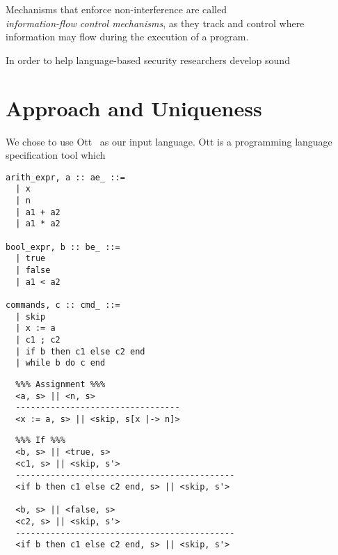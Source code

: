 \documentclass[sigplan,10pt]{acmart}\settopmatter{printfolios=true,printccs=false,printacmref=false}
\begin{document}
Mechanisms that enforce non-interference are called \\\emph{information-flow control mechanisms}, as they track and control where information may flow during the execution of a program.



In order to help language-based security researchers develop sound




\section{Approach and Uniqueness}
We chose to use Ott~\cite{DBLP:journals/jfp/SewellNOPRSS10} as our input language. Ott is a programming language specification tool which 



\begin{lstlisting}[captionpos=b,caption=Syntax of a simple imperative language]
arith_expr, a :: ae_ ::=
  | x         
  | n                        
  | a1 + a2                  
  | a1 * a2                       

bool_expr, b :: be_ ::=
  | true                        
  | false   
  | a1 < a2          

commands, c :: cmd_ ::=
  | skip    
  | x := a 
  | c1 ; c2           
  | if b then c1 else c2 end
  | while b do c end   
\end{lstlisting}

\begin{lstlisting}
  %%% Assignment %%%
  <a, s> || <n, s>
  ---------------------------------
  <x := a, s> || <skip, s[x |-> n]>
\end{lstlisting}

\begin{lstlisting}
  %%% If %%%
  <b, s> || <true, s>
  <c1, s> || <skip, s'>
  --------------------------------------------
  <if b then c1 else c2 end, s> || <skip, s'>
  
  <b, s> || <false, s>
  <c2, s> || <skip, s'>
  --------------------------------------------
  <if b then c1 else c2 end, s> || <skip, s'>
\end{lstlisting}
\end{document}
